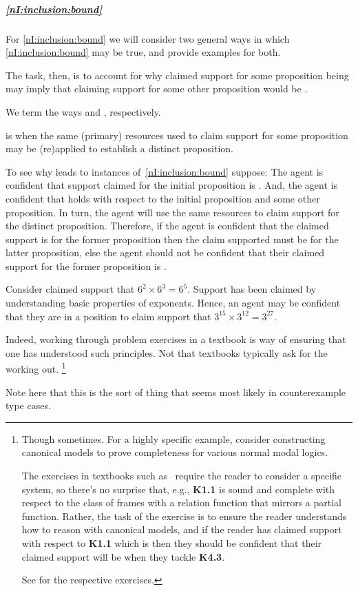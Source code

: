 \subparagraph{\ref{nI:inclusion:bound}}

\begin{note}
  For \ref{nI:inclusion:bound} we will consider two general ways in which \ref{nI:inclusion:bound} may be true, and provide examples for both.

  The task, then, is to account for why claimed support for some proposition being \nmom{} may imply that claiming support for some other proposition would be \nmom{}.

  We term the ways \incl{} and \asso{}, respectively.
\end{note}


\begin{note}[Inclusion]
  \incl{} is when the same (primary) resources used to claim support for some proposition may be (re)applied to establish a distinct proposition.

  To see why \incl{} leads to instances of~\ref{nI:inclusion:bound} suppose:
  The agent is confident that support claimed for the initial proposition is \nmom{}.
  And, the agent is confident that \incl{} holds with respect to the initial proposition and some other proposition.
  In turn, the agent will use the same resources to claim support for the distinct proposition.
  Therefore, if the agent is confident that the claimed support is \nmom{} for the former proposition then the claim supported must be \nmom{} for the latter proposition, else the agent should not be confident that their claimed support for the former proposition is \nmom{}.

  \begin{illustration}
    Consider claimed support that \(6^{2} \times 6^{3} = 6^{5}\).
    Support has been claimed by understanding basic properties of exponents.
    Hence, an agent may be confident that they are in a position to claim support that \(3^{15} \times 3^{12} = 3^{27}\).
  \end{illustration}
  Indeed, working through problem exercises in a textbook is way of ensuring that one has understood such principles.
  Not that textbooks typically ask for the working out.\nolinebreak
  \footnote{
    Though sometimes.
    For a highly specific example, consider constructing canonical models to prove completeness for various normal modal logics.

    The exercises in textbooks such as~ require the reader to consider a specific system, so there's no surprise that, e.g., \textbf{K1.1} is sound and complete with respect to the class of frames with a relation function that mirrors a partial function.
    Rather, the task of the exercise is to ensure the reader understands how to reason with canonical models, and if the reader has claimed support with respect to \textbf{K1.1} which is \nmom{} then they should be confident that their claimed support will be \nmom{} when they tackle \textbf{K4.3}.

    See \textcite[210]{Blackburn:2002aa} for the respective exercises.
  }

  {
    \color{red}
    Note here that this is the sort of thing that seems most likely in counterexample type cases.
  }
\end{note}


